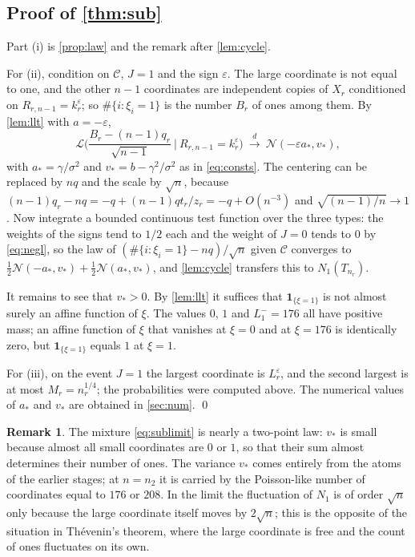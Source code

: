 \documentclass[11pt]{amsart}
\theoremstyle{definition}
\newtheorem{remark}[theorem]{Remark}
\newcommand{\Law}{\mathcal{L}}
\newcommand{\Nor}{\mathcal{N}}
\newcommand{\Cond}{\mathcal{C}}
\newcommand{\Ind}{\mathbf{1}}
\begin{document}
\subsection{Proof of \texorpdfstring{\cref{thm:sub}}{Theorem 1.1}}

Part (i) is \cref{prop:law} and the remark after \cref{lem:cycle}.

For (ii), condition on $\Cond$, $J=1$ and the sign $\varepsilon$. The large coordinate is not equal to one, and the other $n-1$ coordinates are independent copies of $X_r$ conditioned on $R_{r,n-1}=k_r^\varepsilon$; so $\#\{i:\xi_i=1\}$ is the number $B_r$ of ones among them. By \cref{lem:llt} with $a=-\varepsilon$,
\[
\Law\Big(\frac{B_r-(n-1)q_r}{\sqrt{n-1}}\ \Big|\ R_{r,n-1}=k_r^\varepsilon\Big)\ \xrightarrow{d}\ \Nor(-\varepsilon a_*,v_*),
\]
with $a_*=\gamma/\sigma^2$ and $v_*=b-\gamma^2/\sigma^2$ as in \eqref{eq:consts}. The centering can be replaced by $nq$ and the scale by $\sqrt n$, because $(n-1)q_r-nq=-q+(n-1)qt_r/z_r=-q+O(n^{-3})$ and $\sqrt{(n-1)/n}\to1$. Now integrate a bounded continuous test function over the three types: the weights of the signs tend to $1/2$ each and the weight of $J=0$ tends to $0$ by \eqref{eq:negl}, so the law of $(\#\{i:\xi_i=1\}-nq)/\sqrt n$ given $\Cond$ converges to $\tfrac12\Nor(-a_*,v_*)+\tfrac12\Nor(a_*,v_*)$, and \cref{lem:cycle} transfers this to $N_1(T_{n_r})$.

It remains to see that $v_*>0$. By \cref{lem:llt} it suffices that $\Ind_{\{\xi=1\}}$ is not almost surely an affine function of $\xi$. The values $0$, $1$ and $L_1^-=176$ all have positive mass; an affine function of $\xi$ that vanishes at $\xi=0$ and at $\xi=176$ is identically zero, but $\Ind_{\{\xi=1\}}$ equals $1$ at $\xi=1$.

For (iii), on the event $J=1$ the largest coordinate is $L_r^\varepsilon$, and the second largest is at most $M_r=n_r^{1/4}$; the probabilities were computed above. The numerical values of $a_*$ and $v_*$ are obtained in \cref{sec:num}. \qed

\begin{remark}
The mixture \eqref{eq:sublimit} is nearly a two-point law: $v_*$ is small because almost all small coordinates are $0$ or $1$, so that their sum almost determines their number of ones. The variance $v_*$ comes entirely from the atoms of the earlier stages; at $n=n_2$ it is carried by the Poisson-like number of coordinates equal to $176$ or $208$. In the limit the fluctuation of $N_1$ is of order $\sqrt n$ only because the large coordinate itself moves by $2\sqrt n$; this is the opposite of the situation in Th\'evenin's theorem, where the large coordinate is free and the count of ones fluctuates on its own.
\end{remark}
\end{document}
